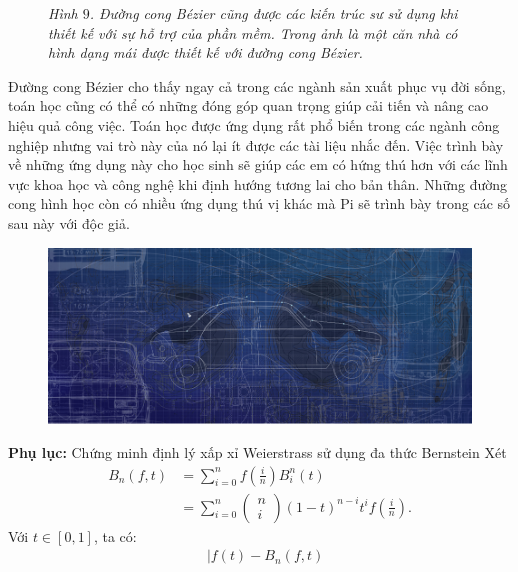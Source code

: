 \begin{multicols}{2}
\begin{figure}[H]
		\caption{\small\textit{\color{toanhocdoisong}Hình $9$. Đường cong Bézier cũng được các kiến trúc sư sử dụng khi thiết kế với sự hỗ trợ của phần mềm. Trong ảnh là một căn nhà có hình dạng mái được thiết kế với đường cong Bézier.}}
		\vspace*{-10pt}
	\end{figure}
	Đường cong Bézier cho thấy ngay cả trong các ngành sản xuất phục vụ đời sống, toán học cũng có thể có những đóng góp quan trọng giúp cải tiến và nâng cao hiệu quả công việc. Toán học được ứng dụng rất phổ biến trong các ngành công nghiệp nhưng vai trò này của nó lại ít được các tài liệu nhắc đến. Việc trình bày về những ứng dụng này cho học sinh sẽ giúp các em có hứng thú hơn với các lĩnh vực khoa học và công nghệ khi định hướng tương lai cho bản thân. Những đường cong hình học còn có nhiều ứng dụng thú vị khác mà Pi sẽ trình bày trong các số sau này với độc giả.
	\begin{figure}[H]
		\vspace*{-5pt}
		\centering
		\captionsetup{labelformat= empty, justification=centering}
		\includegraphics[width= 1\linewidth]{16}
		\vspace*{-18pt}
	\end{figure}
	\textbf{\color{toanhocdoisong}Phụ lục:} Chứng minh định lý xấp xỉ Weierstrass sử dụng đa thức Bernstein
	\vskip 0.1cm
	Xét 
	\begin{align*}
		B_n(f,t) &= \sum\limits_{i = 0}^n {f\left( {\frac{i}{n}} \right)B_i^n(t)}  \\
		&= \sum\limits_{i = 0}^n {\left( \begin{array}{l}
				n\\
				i
			\end{array} \right){{(1 - t)}^{n - i}}{t^i}f\left( {\frac{i}{n}} \right)}.
	\end{align*}
	Với $t\in [0,1]$, ta có:
	\begin{align*}
		&|f(t) - B_n(f,t) \\

\end{align*}
\end{multicols}
